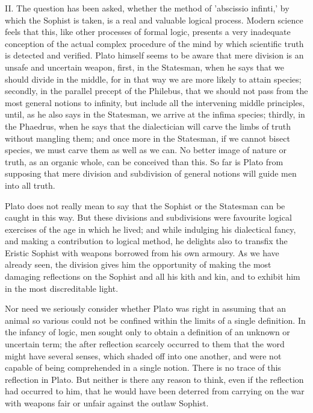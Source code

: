 \documentclass[11pt,letter]{article}
\begin{document}
\par  II. The question has been asked, whether the method of 'abscissio infinti,' by which the Sophist is taken, is a real and valuable logical process. Modern science feels that this, like other processes of formal logic, presents a very inadequate conception of the actual complex procedure of the mind by which scientific truth is detected and verified. Plato himself seems to be aware that mere division is an unsafe and uncertain weapon, first, in the Statesman, when he says that we should divide in the middle, for in that way we are more likely to attain species; secondly, in the parallel precept of the Philebus, that we should not pass from the most general notions to infinity, but include all the intervening middle principles, until, as he also says in the Statesman, we arrive at the infima species; thirdly, in the Phaedrus, when he says that the dialectician will carve the limbs of truth without mangling them; and once more in the Statesman, if we cannot bisect species, we must carve them as well as we can. No better image of nature or truth, as an organic whole, can be conceived than this. So far is Plato from supposing that mere division and subdivision of general notions will guide men into all truth.

\par  Plato does not really mean to say that the Sophist or the Statesman can be caught in this way. But these divisions and subdivisions were favourite logical exercises of the age in which he lived; and while indulging his dialectical fancy, and making a contribution to logical method, he delights also to transfix the Eristic Sophist with weapons borrowed from his own armoury. As we have already seen, the division gives him the opportunity of making the most damaging reflections on the Sophist and all his kith and kin, and to exhibit him in the most discreditable light.

\par  Nor need we seriously consider whether Plato was right in assuming that an animal so various could not be confined within the limits of a single definition. In the infancy of logic, men sought only to obtain a definition of an unknown or uncertain term; the after reflection scarcely occurred to them that the word might have several senses, which shaded off into one another, and were not capable of being comprehended in a single notion. There is no trace of this reflection in Plato. But neither is there any reason to think, even if the reflection had occurred to him, that he would have been deterred from carrying on the war with weapons fair or unfair against the outlaw Sophist.
\end{document}
